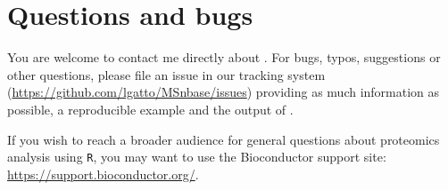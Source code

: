 \section*{Questions and bugs}

You are welcome to contact me directly about . For
bugs, typos, suggestions or other questions, please file an issue in
our tracking system (\url{https://github.com/lgatto/MSnbase/issues})
providing as much information as possible, a reproducible example and
the output of .

If you wish to reach a broader audience for general questions about
proteomics analysis using \texttt{R}, you may want to use the
Bioconductor support site: \url{https://support.bioconductor.org/}.

